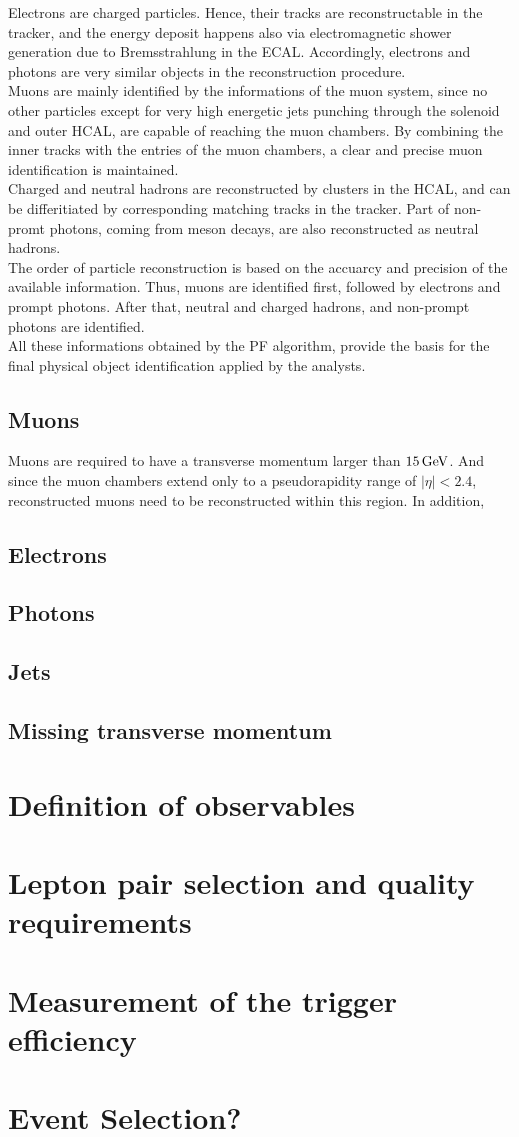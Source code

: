 Electrons are charged particles. Hence, their tracks are reconstructable in the tracker, and the energy deposit happens also via electromagnetic shower generation due to Bremsstrahlung in the ECAL. Accordingly, electrons and photons are very similar objects in the reconstruction procedure.\\
Muons are mainly identified by the informations of the muon system, since no other particles except for very high energetic jets punching through the solenoid and outer HCAL, are capable of reaching the muon chambers. By combining the inner tracks with the entries of the muon chambers, a clear and precise muon identification is maintained.\\
Charged and neutral hadrons are reconstructed by clusters in the HCAL, and can be differitiated by corresponding matching tracks in the tracker. Part of non-promt photons, \eg coming from meson decays, are also reconstructed as neutral hadrons.\\
The order of particle reconstruction is based on the accuarcy and precision of the available information. Thus, muons are identified first, followed by electrons and prompt photons. After that, neutral and charged hadrons, and non-prompt photons are identified.\\
All these informations obtained by the PF algorithm, provide the basis for the final physical object identification applied by the analysts.

\subsection{Muons}
Muons are required to have a transverse momentum larger than $15\,\text{Ge\hspace{-.08em}V}$. And since the muon chambers extend only to a pseudorapidity range of $|\eta|<2.4$, reconstructed muons need to be reconstructed within this region. In addition,


\subsection{Electrons}
\subsection{Photons}
\subsection{Jets}
\subsection{Missing transverse momentum}

\section{Definition of observables}


\section{Lepton pair selection and quality requirements}

\section{Measurement of the trigger efficiency}


\section{Event Selection?}
